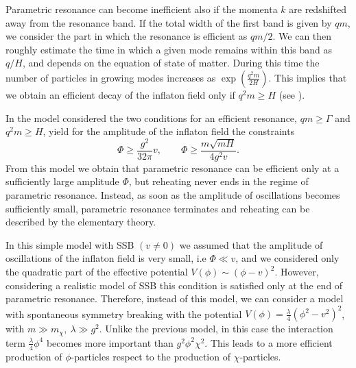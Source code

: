 \documentclass[11pt,a4paper,twoside]{book}
\begin{document}
Parametric resonance can become inefficient also if the  momenta $ k $ are redshifted away from the resonance band. If the total width of the first band is given by $ qm $, we consider the part in which the resonance is efficient as $ qm/2 $. We can then roughly estimate the time in which a given mode remains within this band as $ q/H $, and depends on the equation of state of matter. During this time the number of particles in growing modes increases as $ \exp(\frac{q^{2}m}{2H}) $. This implies that we obtain an efficient decay of the inflaton field only if $ q^{2}m \ge H $ (see \cite{Chap4:LindePreheatingModel}). 

In the model considered the two conditions for an efficient resonance, $ qm \ge \Gamma $ and $ q^{2}m \ge H $, yield for the amplitude of the inflaton field the constraints
\begin{equation}
\label{Chap4:conditionAmplitudeField}
\Phi \ge \frac{g^{2}}{32\pi}v, \qquad  \Phi \ge \frac{m\sqrt{mH}}{4g^{2}v}.
\end{equation}
From this model we obtain that parametric resonance can be efficient only at a sufficiently large  amplitude $\Phi$, but reheating never ends in the regime of parametric resonance. Instead, as soon as the amplitude of oscillations becomes sufficiently  small, parametric resonance terminates and reheating can be described by the elementary theory.

In this simple model with SSB $ (v \neq 0) $ we assumed that the amplitude of oscillations of the inflaton field is very small, i.e $ \Phi \ll v $, and we considered only the quadratic part of the effective potential $ V(\phi) \sim (\phi - v)^{2} $. However, considering a realistic model of SSB this condition is satisfied only at the end of parametric resonance. Therefore, instead of this model, we can consider a model with spontaneous symmetry breaking with the potential $ V(\phi)=\frac{\lambda}{4}(\phi^{2}-v^{2})^{2} $, with $ m \gg m_{\chi},\ \lambda \gg g^{2} $. Unlike the previous model, in this case the interaction term $\frac{\lambda}{4}\phi^{4}  $ becomes more important than $ g^{2}\phi^{2}\chi^{2} $. This leads to a more efficient production of $ \phi $-particles respect to the production of $ \chi $-particles.
\end{document}

